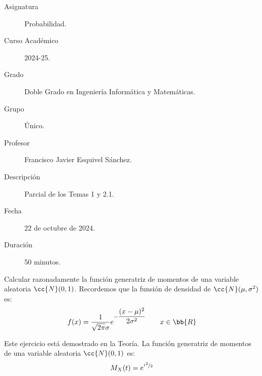 \documentclass[12pt]{article}
\begin{document}

    
    

    \begin{description}
        \item[Asignatura] Probabilidad.
        \item[Curso Académico] 2024-25.
        \item[Grado] Doble Grado en Ingeniería Informática y Matemáticas.
        \item[Grupo] Único.
        \item[Profesor] Francisco Javier Esquivel Sánchez.
        \item[Descripción] Parcial de los Temas 1 y 2.1.
        \item[Fecha] 22 de octubre de 2024.
        \item[Duración] 50 minutos.
    \end{description}
    \newpage

    \begin{ejercicio}[$1$ punto]
        Calcular razonadamente la función generatriz de momentos de una variable aleatoria $\cc{N}(0, 1)$.
        Recordemos que la funsión de densidad de $\cc{N}(\mu, \sigma^2)$ es:
        \begin{equation*}
            f(x) = \dfrac{1}{\sqrt{2\pi}\sigma}e^{-\dfrac{(x-\mu)^2}{2\sigma^2}} \qquad x\in \bb{R}
        \end{equation*}

        Este ejercicio está demostrado en la Teoría. La función generatriz de momentos de una variable aleatoria $\cc{N}(0, 1)$ es:
        \begin{equation*}
            M_X(t) = e^{\nicefrac{t^2}{2}}
        \end{equation*}
    \end{ejercicio}
\end{document}
